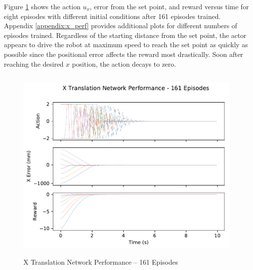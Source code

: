 Figure \ref{fig:x_perf} shows the action $u_x$, error from the set point, and reward versus time for eight episodes with different initial conditions after 161 episodes trained. Appendix \ref{appendix:x_perf} provides additional plots for different numbers of episodes trained. Regardless of the starting distance from the set point, the actor appears to drive the robot at maximum speed to reach the set point as quickly as possible since the positional error affects the reward most drastically. Soon after reaching the desired $x$ position, the action decays to zero.
\begin{figure}[H]
	\centering
	\includegraphics[width=6in, height=3.85in, keepaspectratio]{figures/train_figs/transx_transitions/1_161.pdf}
	\caption{X Translation Network Performance -- 161 Episodes}\label{fig:x_perf}
\end{figure}

